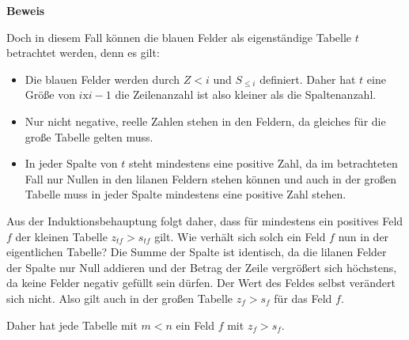 \documentclass[10pt, a4paper, reqno]{amsart}
\makeatletter
\renewcommand\proofname{Beweis}
\renewenvironment{proof}[1][\proofname]{\par
\pushQED{\qed}%
\normalfont \topsep6\p@\@plus6\p@\relax
\trivlist
\item\relax
{\bfseries#1}\hspace\labelsep\ignorespaces
}{%
\popQED\endtrivlist\@endpefalse
}
\makeatother
\begin{document}
\begin{proof}
\begin{itemize}[itemsep=2ex]
    Doch in diesem Fall können die blauen Felder als eigenständige Tabelle $t$
    betrachtet werden, denn es gilt:
    \begin{itemize}
    \item Die blauen Felder werden durch $Z<i$ und $S_{\leq i}$ definiert. Daher
      hat $t$ eine Größe von $i\text{x}{i-1}$ die Zeilenanzahl ist also kleiner
      als die Spaltenanzahl.
    \item Nur nicht negative, reelle Zahlen stehen in den Feldern, da gleiches
      für die große Tabelle gelten muss.
    \item In jeder Spalte von $t$ steht mindestens eine positive Zahl, da im betrachteten
      Fall nur Nullen in den lilanen Feldern stehen können und auch in der
      großen Tabelle muss in jeder Spalte mindestens eine positive Zahl stehen.
    \end{itemize}
    Aus der Induktionsbehauptung folgt daher, dass für mindestens ein positives
    Feld $f$ der kleinen Tabelle $z_{tf}>s_{tf}$ gilt. Wie verhält sich solch
    ein Feld $f$ nun in der eigentlichen Tabelle? Die Summe der Spalte ist
    identisch, da die lilanen Felder der Spalte nur Null addieren und der Betrag
    der Zeile vergrößert sich höchstens, da keine Felder negativ gefüllt sein
    dürfen. Der Wert des Feldes selbst verändert sich nicht. Also gilt auch in
    der großen Tabelle $z_f>s_f$ für das Feld $f$.

    Daher hat jede Tabelle mit $m<n$ ein Feld $f$ mit $z_f>s_f$.
  \end{itemize}
\end{proof}
\end{document}
